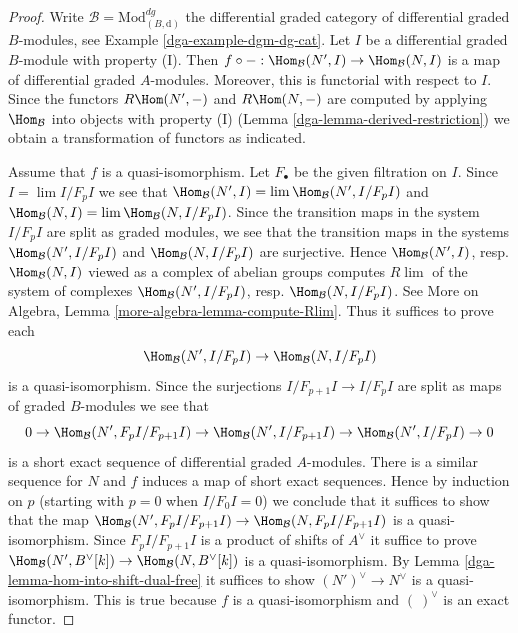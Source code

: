 \begin{proof}

Write $\mathcal{B} = \text{Mod}^{dg}_{(B, \text{d})}$ the
differential graded category of differential graded $B$-modules, see
Example \ref{dga-example-dgm-dg-cat}.
Let $I$ be a differential graded $B$-module with property (I).
Then $f \circ - : \Hom_\mathcal{B}(N', I) \to \Hom_\mathcal{B}(N, I)$
is a map of differential graded $A$-modules. Moreover, this is functorial
with respect to $I$. Since the functors
$ R\Hom(N', -)$ and $R\Hom(N, -)$ are
computed by applying $\Hom_\mathcal{B}$ into objects with property (I)
(Lemma \ref{dga-lemma-derived-restriction}) we obtain a transformation of functors
as indicated.

\medskip\noindent
Assume that $f$ is a quasi-isomorphism. Let $F_\bullet$ be the
given filtration on $I$. Since $I = \lim I/F_pI$ we see that
$\Hom_\mathcal{B}(N', I) = \lim \Hom_\mathcal{B}(N', I/F_pI)$ and
$\Hom_\mathcal{B}(N, I) = \lim \Hom_\mathcal{B}(N, I/F_pI)$.
Since the transition maps in the system $I/F_pI$ are split
as graded modules, we see that the transition maps in the
systems $\Hom_\mathcal{B}(N', I/F_pI)$ and $\Hom_\mathcal{B}(N, I/F_pI)$
are surjective. Hence $\Hom_\mathcal{B}(N', I)$, resp. $\Hom_\mathcal{B}(N, I)$
viewed as a complex of abelian groups computes $R\lim$ of the system
of complexes
$\Hom_\mathcal{B}(N', I/F_pI)$, resp. $\Hom_\mathcal{B}(N, I/F_pI)$.
See More on Algebra, Lemma \ref{more-algebra-lemma-compute-Rlim}.
Thus it suffices to prove each
$$
\Hom_\mathcal{B}(N', I/F_pI) \to \Hom_\mathcal{B}(N, I/F_pI)
$$
is a quasi-isomorphism. Since the surjections $I/F_{p + 1}I \to I/F_pI$
are split as maps of graded $B$-modules we see that
$$
0 \to \Hom_\mathcal{B}(N', F_pI/F_{p + 1}I) \to
\Hom_\mathcal{B}(N', I/F_{p + 1}I) \to
\Hom_\mathcal{B}(N', I/F_pI) \to 0
$$
is a short exact sequence of differential graded $A$-modules.
There is a similar sequence for $N$ and $f$ induces a map
of short exact sequences. Hence by induction on $p$ (starting with $p = 0$
when $I/F_0I = 0$) we conclude that it suffices to show that
the map
$\Hom_\mathcal{B}(N', F_pI/F_{p + 1}I) \to \Hom_\mathcal{B}(N, F_pI/F_{p + 1}I)$
is a quasi-isomorphism. Since $F_pI/F_{p + 1}I$ is a product of shifts of
$A^\vee$ it suffice to prove
$\Hom_\mathcal{B}(N', B^\vee[k]) \to \Hom_\mathcal{B}(N, B^\vee[k])$
is a quasi-isomorphism. By Lemma \ref{dga-lemma-hom-into-shift-dual-free}
it suffices to show $(N')^\vee \to N^\vee$ is a quasi-isomorphism.
This is true because $f$ is a quasi-isomorphism and $(\ )^\vee$
is an exact functor.
\end{proof}

